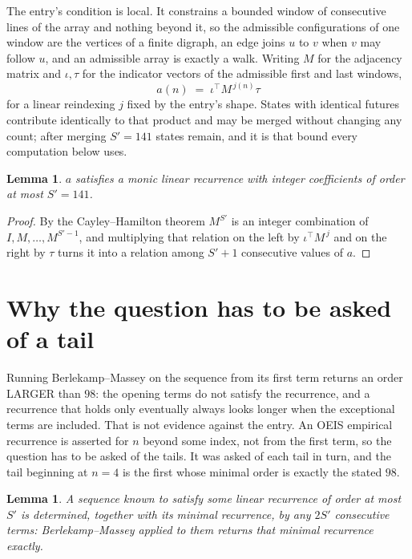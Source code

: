 \documentclass[11pt,a4paper]{article}
\theoremstyle{plain}
\newtheorem{lemma}[theorem]{Lemma}
\theoremstyle{definition}
\begin{document}
The entry's condition is local. It constrains a bounded window of consecutive lines of the
array and nothing beyond it, so the admissible configurations of one window are the vertices of
a finite digraph, an edge joins $u$ to $v$ when $v$ may follow $u$, and an admissible array is
exactly a walk. Writing $M$ for the adjacency matrix and $\iota,\tau$ for the indicator vectors
of the admissible first and last windows,
\[
a(n)\;=\;\iota^{\!\top}M^{\,j(n)}\tau
\]
for a linear reindexing $j$ fixed by the entry's shape. States with identical futures
contribute identically to that product and may be merged without changing any count; after
merging $S'=141$ states remain, and it is that bound every computation below uses.

\begin{lemma}\label{lem:cf}
$a$ satisfies a monic linear recurrence with integer coefficients of order at most $S'=141$.
\end{lemma}

\begin{proof}
By the Cayley--Hamilton theorem $M^{S'}$ is an integer combination of $I,M,\dots,M^{S'-1}$,
and multiplying that relation on the left by $\iota^{\!\top}M^{\,j}$ and on the right by
$\tau$ turns it into a relation among $S'+1$ consecutive values of $a$.
\end{proof}

\section{Why the question has to be asked of a tail}

Running Berlekamp--Massey on the sequence from its first term returns an order LARGER than $98$: the opening terms do not satisfy the recurrence, and a recurrence that holds only eventually always looks longer when the exceptional terms are included. That is not evidence against the entry. An OEIS empirical recurrence is asserted for $n$ beyond some index, not from the first term, so the question has to be asked of the tails. It was asked of each tail in turn, and the tail beginning at $n=4$ is the first whose minimal order is exactly the stated $98$.

\begin{lemma}\label{lem:bm}
A sequence known to satisfy some linear recurrence of order at most $S'$ is determined,
together with its minimal recurrence, by any $2S'$ consecutive terms: Berlekamp--Massey applied
to them returns that minimal recurrence exactly.
\end{lemma}
\end{document}
